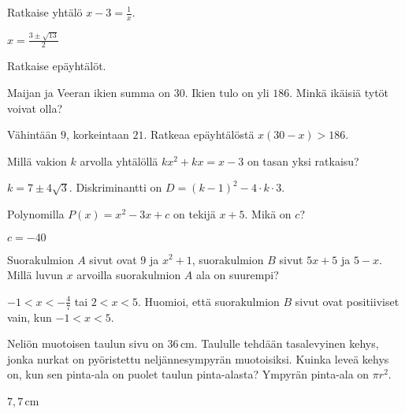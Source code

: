 \begin{tehtavasivu}
\begin{tehtava}
Ratkaise yhtälö $x - 3 = \frac{1}{x}$.
    \begin{vastaus}
    $x =\frac{3 \pm \sqrt{13}}{2}$
    \end{vastaus}
\end{tehtava}

\begin{tehtava} 
Ratkaise epäyhtälöt.
    \begin{vastaus}
    \end{vastaus}
\end{tehtava}

\begin{tehtava} 
Maijan ja Veeran ikien summa on $30$. Ikien tulo on yli $186$. Minkä ikäisiä tytöt voivat olla?
    \begin{vastaus}
	Vähintään $9$, korkeintaan $21$. Ratkeaa epäyhtälöstä $x(30-x)>186$.
	\end{vastaus}
\end{tehtava}

\begin{tehtava} 
Millä vakion $k$ arvolla yhtälöllä $kx^2+kx=x-3$ on tasan yksi ratkaisu?
    \begin{vastaus}
		$k = 7 \pm 4 \sqrt{3}$. Diskriminantti on $D = (k-1)^2-4\cdot k \cdot 3$.
    \end{vastaus}
\end{tehtava}

\begin{tehtava} 
Polynomilla $P(x)=x^2-3x+c$ on tekijä $x+5$. Mikä on $c$?
    \begin{vastaus}
		$c=-40$
    \end{vastaus}
\end{tehtava}

\begin{tehtava} 
Suorakulmion $A$ sivut ovat $9$ ja $x^2+1$, suorakulmion $B$ sivut $5x+5$
ja $5-x$. Millä luvun $x$ arvoilla suorakulmion $A$ ala on suurempi?
    \begin{vastaus}
	$-1 < x < -\frac{4}{7}$ tai $2 < x < 5$. Huomioi, että suorakulmion $B$
    sivut ovat positiiviset vain, kun $-1<x<5$.
    \end{vastaus}
\end{tehtava}

\begin{tehtava} %
Neliön muotoisen taulun sivu on $36$\,cm. Taululle tehdään tasalevyinen kehys, jonka nurkat on pyöristettu neljännesympyrän muotoisiksi. Kuinka leveä kehys on, kun sen pinta-ala on puolet taulun pinta-alasta? Ympyrän pinta-ala on $\pi r^2$.
    \begin{vastaus}
     $7,7$\,cm
    \end{vastaus}
\end{tehtava}


\end{tehtavasivu}
